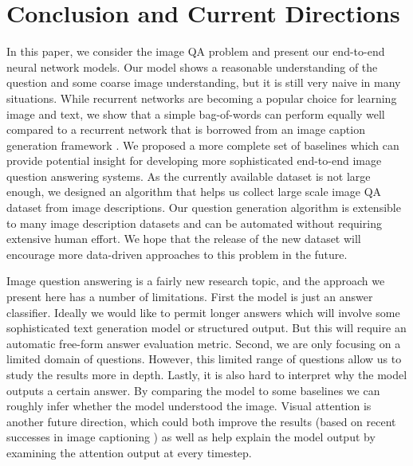 \documentclass{article} %
\renewcommand{\#}[1]{\textbf{#1}}
\begin{document}
\section{Conclusion and Current Directions}
In this paper, we consider the image QA problem and present our 
end-to-end neural network models. Our model shows a reasonable 
understanding of the question and some coarse image understanding, 
but it is still very naive in many situations. 
While recurrent networks are becoming a popular choice for learning 
image and text, we show that a simple bag-of-words can 
perform equally well compared to a recurrent network that 
is borrowed from an image caption generation framework \cite{vinyals14}. 
We proposed a more complete set of baselines which can 
provide potential insight 
for developing more sophisticated 
end-to-end image question answering systems.
As the currently available dataset is not large enough, 
we designed an algorithm that helps us collect large scale image 
QA dataset from image descriptions. Our question 
generation algorithm is extensible to many image description datasets 
and can be automated without requiring extensive human effort. We 
hope that the release of the new dataset will encourage more 
data-driven approaches to this problem in the future.

Image question answering is a fairly new research topic, and the approach we
present here has a number of limitations. First the model is just an answer
classifier. Ideally we would like to permit longer answers which will involve
some sophisticated text generation model or structured output. But 
this will require an automatic free-form answer evaluation metric. Second, we are 
only focusing on a limited domain of questions. However, this limited range
of questions allow us to study the results more in depth. Lastly, it is also hard to 
interpret why the model outputs a certain
answer. By comparing the model to some baselines we can roughly infer whether 
the model understood the image.
Visual attention is another future direction, which could both 
improve the results (based on recent successes in image captioning \cite{xu15}) 
as well as help explain the model output by examining the attention output at every
timestep.


\begin{small}


\end{small}
\end{document}
